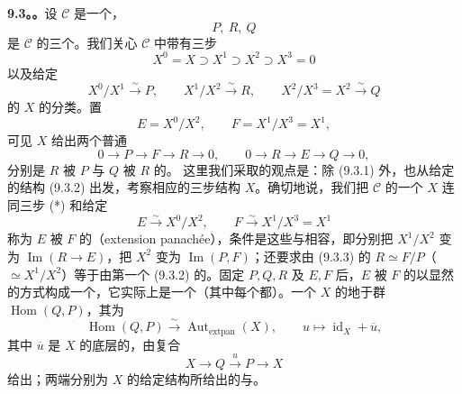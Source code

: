 \textbf{9.3。。}设 $\mathcal C$ 是一个，
\begin{equation}\tag{9.3.1}
 P,\ R,\ Q
\end{equation}
是 $\mathcal C$ 的三个。我们关心 $\mathcal C$ 中带有三步
\begin{equation}\tag{*}
 X^0=X\supset X^1\supset X^2\supset X^3=0
\end{equation}
以及给定
\[
 X^0/X^1\xrightarrow{\sim}P,\qquad
 X^1/X^2\xrightarrow{\sim}R,\qquad
 X^2/X^3=X^2\xrightarrow{\sim}Q
\]
的 $X$ 的分类。置
\[
 E=X^0/X^2,\qquad F=X^1/X^3=X^1,
\]
可见 $X$ 给出两个普通
\begin{equation}\tag{9.3.2}
 0\longrightarrow P\longrightarrow F\longrightarrow R\longrightarrow0,
 \qquad 0\longrightarrow R\longrightarrow E\longrightarrow Q\longrightarrow0,
\end{equation}
分别是 $R$ 被 $P$ 与 $Q$ 被 $R$ 的。
这里我们采取的观点是：除 (9.3.1) 外，也从给定的结构 (9.3.2) 出发，考察相应的三步结构 $X$。确切地说，我们把 $\mathcal C$ 的一个 $X$ 连同三步 (*) 和给定
\begin{equation}\tag{9.3.3}
 E\xrightarrow{\sim}X^0/X^2,\qquad F\xrightarrow{\sim}X^1/X^3=X^1
\end{equation}
称为 $E$ 被 $F$ 的（extension panachée），条件是这些与相容，即分别把 $X^1/X^2$ 变为 $\operatorname{Im}(R\to E)$，把 $X^2$ 变为 $\operatorname{Im}(P,F)$；还要求由 (9.3.3) 的 $R\simeq F/P$（$\simeq X^1/X^2$）等于由第一个 (9.3.2) 的。固定 $P,Q,R$ 及 $E,F$ 后，$E$ 被 $F$ 的以显然的方式构成一个，它实际上是一个（其中每个都）。一个 $X$ 的地于群 $\operatorname{Hom}(Q,P)$，其为
\begin{equation}\tag{9.3.4}
 \operatorname{Hom}(Q,P)\xrightarrow{\sim}\operatorname{Aut}_{\mathrm{extpan}}(X),
 \qquad u\longmapsto\operatorname{id}_X+\overline u,
\end{equation}
其中 $\overline u$ 是 $X$ 的底层的，由复合
\[
 X\longrightarrow Q\xrightarrow{u}P\longrightarrow X
\]
给出；两端分别为 $X$ 的给定结构所给出的与。

